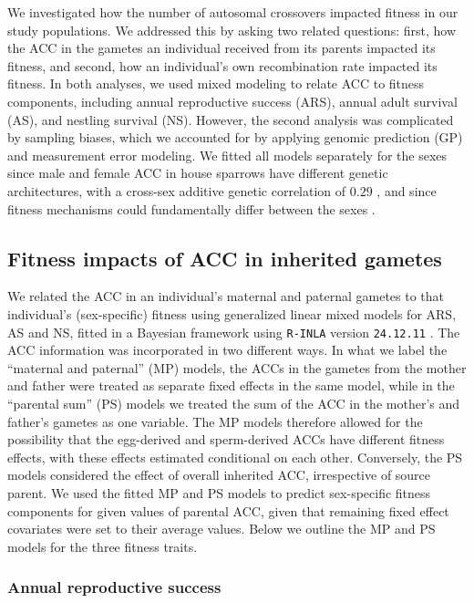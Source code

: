 \documentclass[dvipsnames]{article}
\begin{document}
We investigated how the number of autosomal crossovers impacted fitness in our study populations.
We addressed this by asking two related questions: first, how the ACC in the gametes an individual received from its parents impacted its fitness, and second, how an individual's own recombination rate impacted its fitness.
In both analyses, we used mixed modeling to relate ACC to fitness components, including annual reproductive success (ARS), annual adult survival (AS), and nestling survival (NS).
However, the second analysis was complicated by sampling biases, which we accounted for by applying genomic prediction (GP) and measurement error modeling.
We fitted all models separately for the sexes since male and female ACC in house sparrows have different genetic architectures, with a cross-sex additive genetic correlation of $0.29$ \citep{mcauley2024genetic}, and since fitness mechanisms could fundamentally differ between the sexes .

\subsection*{Fitness impacts of ACC in inherited gametes}

We related the ACC in an individual's maternal and paternal gametes to that individual's (sex-specific) fitness using generalized linear mixed models for ARS, AS and NS, fitted in a Bayesian framework using \texttt{R-INLA} version \texttt{24.12.11} \citep{rue2009approximate}.
The ACC information was incorporated in two different ways. 
In what we label the ``maternal and paternal'' (MP) models, the ACCs in the gametes from the mother and father were treated as separate fixed effects in the same model, while in the ``parental sum'' (PS) models we treated the sum of the ACC in the mother's and father's gametes as one variable.
The MP models therefore allowed for the possibility that the egg-derived and sperm-derived ACCs have different fitness effects, with these effects estimated conditional on each other.
Conversely, the PS models considered the effect of overall inherited ACC, irrespective of source parent.
We used the fitted MP and PS models to predict sex-specific fitness components for given values of parental ACC, given that remaining fixed effect covariates were set to their average values.
Below we outline the MP and PS models for the three fitness traits.

\subsubsection*{Annual reproductive success}
\end{document}
